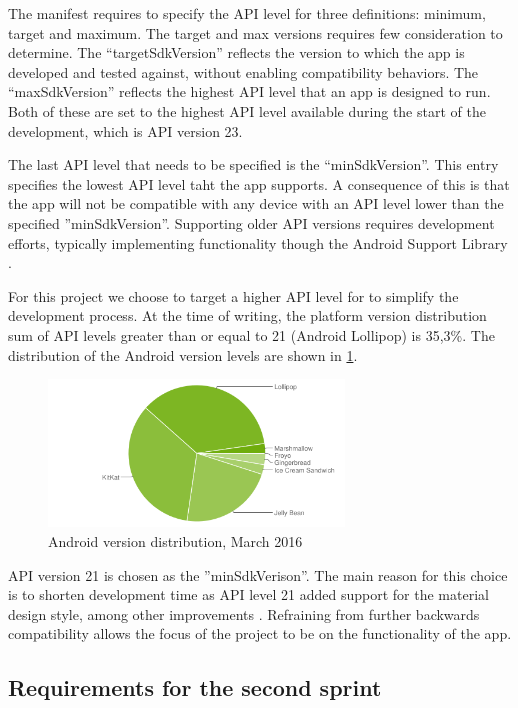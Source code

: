 The manifest requires to specify the API level for three definitions: minimum, target and maximum.
The target and max versions requires few consideration to determine.
The ``targetSdkVersion'' reflects the version to which the app is developed and tested against, without enabling compatibility behaviors.
The ``maxSdkVersion'' reflects the highest API level that an app is designed to run.
Both of these are set to the highest API level available during the start of the development, which is API version 23.

The last API level that needs to be specified is the ``minSdkVersion''.
This entry specifies the lowest API level taht the app supports.
A consequence of this is that the app will not be compatible with any device with an API level lower than the specified ''minSdkVersion''.
Supporting older API versions requires development efforts, typically implementing functionality though the Android Support Library \cite{androidSL}.

For this project we choose to target a higher API level for to simplify the development process.
At the time of writing, the platform version distribution sum of API levels greater than or equal to 21 (Android Lollipop) is 35,3\%.
The distribution of the Android version levels are shown in \ref{fig:dashboard}.

\begin{figure}[h]
	\begin{center}
	\includegraphics[width=0.7\textwidth]{figures/android-chart-march.png}
	\end{center}
	\caption{Android version distribution, March 2016 \cite{androidDashboard}}
	\label{fig:dashboard}
\end{figure}

API version 21 is chosen as the ''minSdkVerison''. 
The main reason for this choice is to shorten development time as API level 21 added support for the material design style, among other improvements \cite{android5API}. 
Refraining from further backwards compatibility allows the focus of the project to be on the functionality of the app. 






\subsection{Requirements for the second sprint}
